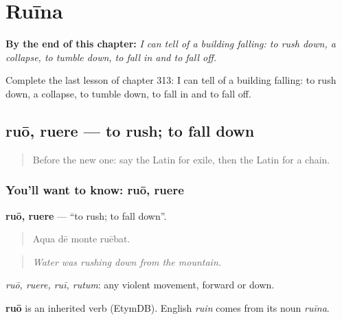 
\chapter{Ruīna}
\label{ch:la-ruina}

\begin{chapteropening}
\textbf{By the end of this chapter:} \emph{I can tell of a building falling: to rush down, a collapse, to tumble down, to fall in and to fall off.}

Complete the last lesson of chapter 313: I can tell of a building falling: to rush down, a collapse, to tumble down, to fall in and to fall off.
\end{chapteropening}

\section[ruō, ruere]{ruō, ruere — to rush; to fall down}

\label{lesson:LA-C313-ruo}



\begin{quote}
Before the new one: say the Latin for exile, then the Latin for a chain.
\end{quote}

\subsection*{You'll want to know: ruō, ruere}
\textbf{ruō, ruere} — \textquotedblleft{}to rush; to fall down\textquotedblright{}.

\begin{quote}
Aqua dē monte ruēbat.
\end{quote}

\begin{quote}
\emph{Water was rushing down from the mountain.}
\end{quote}

\emph{ruō, ruere, ruī, rutum}: any violent movement, forward or down.

\begin{cousinweb}
\textbf{ruō} is an inherited verb (EtymDB). English \emph{ruin} comes from its noun \emph{ruīna}.
\end{cousinweb}

